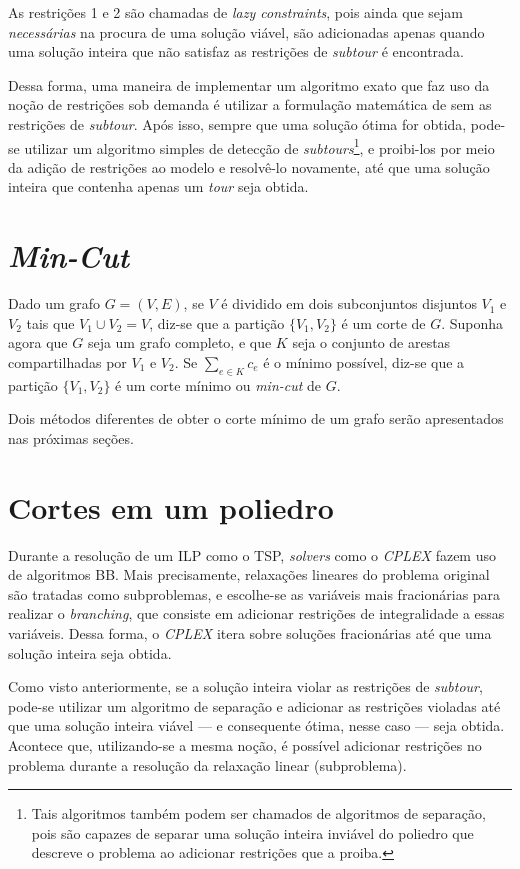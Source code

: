 As restrições 1 e 2 são chamadas de \textit{lazy constraints}, pois ainda que sejam \textit{necessárias} na procura de uma solução viável, são adicionadas apenas quando uma solução inteira que não satisfaz as restrições de \textit{subtour} é encontrada.

Dessa forma, uma maneira de implementar um  algoritmo exato que faz uso da noção de restrições sob demanda é utilizar a formulação matemática de sem as restrições de \textit{subtour}. Após isso, sempre que uma solução ótima for obtida, pode-se utilizar um algoritmo simples de detecção de \textit{subtours}\footnote{Tais algoritmos também podem ser chamados de algoritmos de separação, pois são capazes de separar uma solução inteira inviável do poliedro que descreve o problema ao adicionar restrições que a proiba.}, e proibi-los por meio da adição de restrições ao modelo e resolvê-lo novamente, até que uma solução inteira que contenha apenas um \textit{tour} seja obtida.

\section{\textit{Min-Cut}}
Dado um grafo \(G = (V, E)\), se \(V\) é dividido em dois subconjuntos disjuntos \(V_1\) e \(V_2\) tais que \(V_1 \cup V_2 = V\), diz-se que a partição \(\{V_1, V_2\}\) é um corte de \(G\). Suponha agora que \(G\) seja um grafo completo, e que \(K\) seja o conjunto de arestas compartilhadas por \(V_1\) e \(V_2\). Se \(\sum_{e \in K}c_e\) é o mínimo possível, diz-se que a partição \(\{V_1, V_2\}\) é um corte mínimo ou \textit{min-cut} de \(G\).

Dois métodos diferentes de obter o corte mínimo de um grafo serão apresentados nas próximas seções.

\section{Cortes em um poliedro}
Durante a resolução de um ILP como o TSP, \textit{solvers} como o \textit{CPLEX} fazem uso de algoritmos BB. Mais precisamente, relaxações lineares do problema original são tratadas como subproblemas, e escolhe-se as variáveis mais fracionárias para realizar o \textit{branching}, que consiste em adicionar restrições de integralidade a essas variáveis. Dessa forma, o \textit{CPLEX} itera sobre soluções fracionárias até que uma solução inteira seja obtida. 

Como visto anteriormente, se a solução inteira violar as restrições de \textit{subtour}, pode-se utilizar um algoritmo de separação e adicionar as restrições violadas até que uma solução inteira viável --- e consequente ótima, nesse caso --- seja obtida. Acontece que, utilizando-se a  mesma noção, é possível adicionar restrições no problema durante a resolução da relaxação linear (subproblema). 


